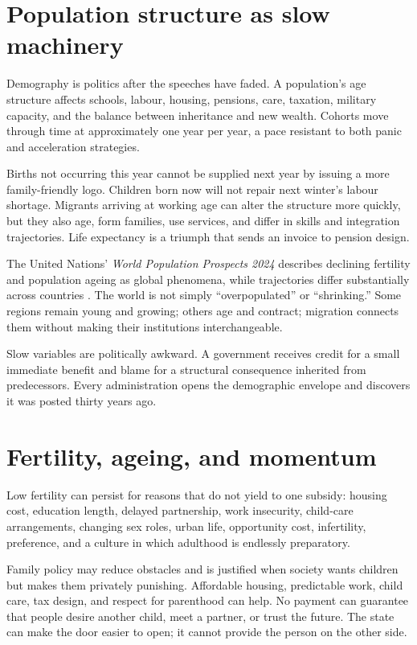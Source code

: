 \documentclass[12pt,a4paper]{book}
\begin{document}
\section{Population structure as slow machinery}

Demography is politics after the speeches have faded.  A population's age
structure affects schools, labour, housing, pensions, care, taxation, military
capacity, and the balance between inheritance and new wealth.  Cohorts move
through time at approximately one year per year, a pace resistant to both
panic and acceleration strategies.

Births not occurring this year cannot be supplied next year by issuing a more
family-friendly logo.  Children born now will not repair next winter's labour
shortage.  Migrants arriving at working age can alter the structure more
quickly, but they also age, form families, use services, and differ in skills
and integration trajectories.  Life expectancy is a triumph that sends an
invoice to pension design.

The United Nations' \emph{World Population Prospects 2024} describes declining
fertility and population ageing as global phenomena, while trajectories differ
substantially across countries \cite{UNWorldPopulationProspects2024}.  The
world is not simply ``overpopulated'' or ``shrinking.''  Some regions remain
young and growing; others age and contract; migration connects them without
making their institutions interchangeable.

Slow variables are politically awkward.  A government receives credit for a
small immediate benefit and blame for a structural consequence inherited from
predecessors.  Every administration opens the demographic envelope and
discovers it was posted thirty years ago.

\section{Fertility, ageing, and momentum}

Low fertility can persist for reasons that do not yield to one subsidy: housing
cost, education length, delayed partnership, work insecurity, child-care
arrangements, changing sex roles, urban life, opportunity cost, infertility,
preference, and a culture in which adulthood is endlessly preparatory.

Family policy may reduce obstacles and is justified when society wants
children but makes them privately punishing.  Affordable housing, predictable
work, child care, tax design, and respect for parenthood can help.  No payment
can guarantee that people desire another child, meet a partner, or trust the
future.  The state can make the door easier to open; it cannot provide the
person on the other side.
\end{document}
